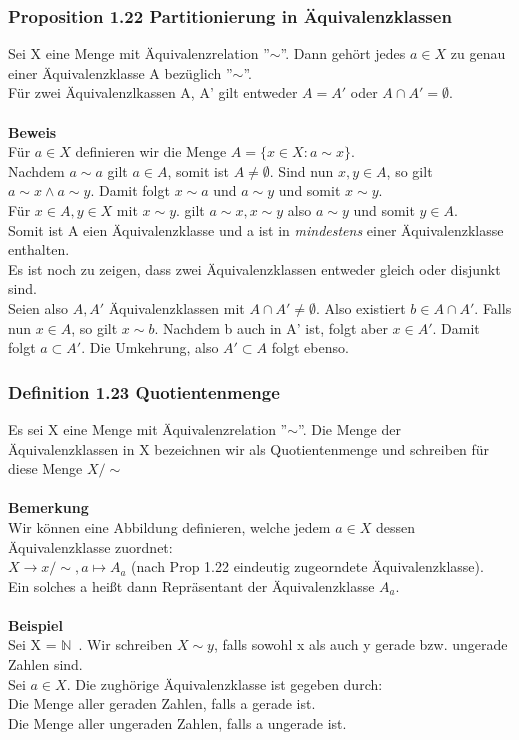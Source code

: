 \documentclass{article}
\newcommand{\mN}{$\mathbb{N}$\ }
\begin{document}
\subsubsection{Proposition 1.22 Partitionierung in Äquivalenzklassen}
Sei X eine Menge mit Äquivalenzrelation ''$\sim$''. Dann gehört jedes $a \in X$ zu genau einer Äquivalenzklasse A bezüglich ''$\sim$''.\\
Für zwei Äquivalenzlkassen A, A' gilt entweder $A = A'$ oder $A\cap A' = \emptyset$.\\
\\
\textbf{Beweis}\\
Für $a \in X$ definieren wir die Menge $A = \{x \in X : a \sim x\}$.\\
Nachdem $a \sim a$ gilt $a \in A$, somit ist $A \neq \emptyset$. Sind nun $x, y \in A$, so gilt $a \sim x \land a \sim y$. Damit folgt $x \sim a$ und $a \sim y$ und somit $x \sim y$.\\
Für $x \in A, y \in X$ mit $x \sim y$. gilt $a \sim x, x \sim y$ also $a \sim y$ und somit $y \in A$.\\
Somit ist A eien Äquivalenzklasse und a ist in \textit{mindestens} einer Äquivalenzklasse enthalten.\\
Es ist noch zu zeigen, dass zwei Äquivalenzklassen entweder gleich oder disjunkt sind.\\
Seien also $A, A'$ Äquivalenzklassen mit $A \cap A' \neq \emptyset$. Also existiert $b \in A\cap A'$. Falls nun $x \in A$, so gilt $x \sim b$. Nachdem b auch in A' ist, folgt aber $x \in A'$. Damit folgt $a \subset A'$. Die Umkehrung, also $A' \subset A$ folgt ebenso.

\subsubsection{Definition 1.23 Quotientenmenge}
Es sei X eine Menge mit Äquivalenzrelation ''$\sim$''. Die Menge der Äquivalenzklassen in X bezeichnen wir  als Quotientenmenge und schreiben
 für diese Menge $X/{\sim}$\\
 \\
 \textbf{Bemerkung}\\
 Wir können eine Abbildung definieren, welche jedem $a \in X$ dessen Äquivalenzklasse zuordnet:\\
 $X \to x/{\sim}, a \mapsto A_a$ (nach Prop 1.22 eindeutig zugeorndete Äquivalenzklasse).\\
 Ein solches a hei\ss{}t dann Repräsentant der Äquivalenzklasse $A_a$.\\
 \\
 \textbf{Beispiel}\\
 Sei X = \mN. Wir schreiben $X \sim y$, falls sowohl x als auch y gerade bzw. ungerade Zahlen sind.\\
 Sei $a \in X$. Die zughörige Äquivalenzklasse ist gegeben durch:\\
 Die Menge aller geraden Zahlen, falls a gerade ist.\\
 Die Menge aller ungeraden Zahlen, falls a ungerade ist.
\end{document}
